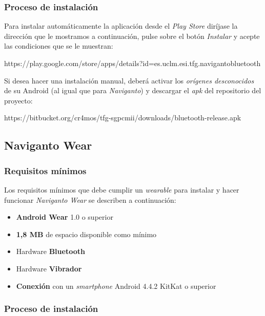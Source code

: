 \subsubsection{Proceso de instalación}

Para instalar automáticamente la aplicación desde el \emph{Play Store} diríjase la dirección que le
mostramos a continuación, pulse sobre el botón \emph{Instalar} y acepte las condiciones que se le
muestran:

\begin{listing}
https://play.google.com/store/apps/details?id=es.uclm.esi.tfg.navigantobluetooth
\end{listing}

Si desea hacer una instalación manual, deberá activar los \emph{orígenes desconocidos} de su Android
(al igual que para \emph{Naviganto}) y descargar el \emph{apk} del repositorio del proyecto:

\begin{listing}
https://bitbucket.org/cr4mos/tfg-sgpcmii/downloads/bluetooth-release.apk
\end{listing}

\subsection{Naviganto Wear}

\subsubsection{Requisitos mínimos}

Los requisitos mínimos que debe cumplir un \emph{wearable} para instalar y hacer funcionar
\emph{Naviganto Wear} se describen a continuación:

\begin{itemize}
  \item \textbf{Android Wear} 1.0 o superior
  \item \textbf{1,8 MB} de espacio disponible como mínimo
  \item Hardware \textbf{Bluetooth}
  \item Hardware \textbf{Vibrador}
  \item \textbf{Conexión} con un \emph{smartphone} Android 4.4.2 KitKat o superior
\end{itemize}

\subsubsection{Proceso de instalación}

